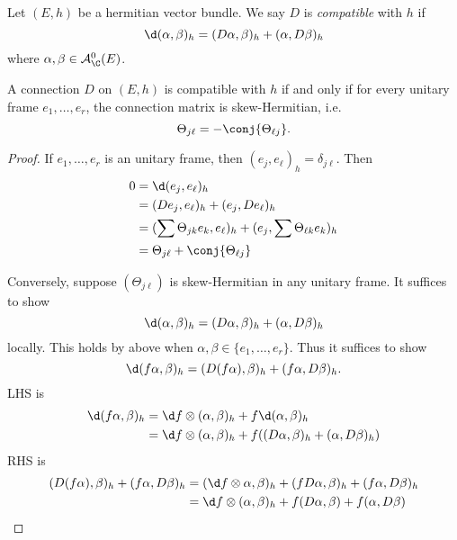 \documentclass[a4paper]{article}
\begin{document}
\begin{definition}
  Let \((E, h)\) be a hermitian vector bundle. We say \(D\) is \emph{compatible} with \(h\) if
  \[
    \d(\alpha, \beta)_h = (D\alpha, \beta)_h + (\alpha, D\beta)_h
  \]
  where \(\alpha, \beta \in \mathcal A_\C^0(E)\).
\end{definition}

\begin{proposition}
  A connection \(D\) on \((E, h)\) is compatible with \(h\) if and only if for every unitary frame \(e_1, \dots, e_r\), the connection matrix is skew-Hermitian, i.e.
  \[
    \Theta_{j\ell} = - \conj{\Theta_{\ell j}}.
  \]
\end{proposition}

\begin{proof}
  If \(e_1, \dots, e_r\) is an unitary frame, then \((e_j, e_\ell)_h = \delta_{j \ell}\). Then
  \begin{align*}
    0
    &= \d (e_j, e_\ell)_h \\
    &= (De_j, e_\ell)_h + (e_j, De_\ell)_h \\
    &= (\sum \Theta_{jk} e_k, e_\ell)_h + (e_j, \sum \Theta_{\ell k} e_k)_h \\
    &= \Theta_{j\ell} + \conj{\Theta_{\ell j}}
  \end{align*}

  Conversely, suppose \((\Theta_{j\ell})\) is skew-Hermitian in any unitary frame. It suffices to show
  \[
    \d(\alpha, \beta)_h = (D\alpha, \beta)_h + (\alpha, D\beta)_h
  \]
  locally. This holds by above when \(\alpha, \beta \in \{e_1, \dots, e_r\}\). Thus it suffices to show
  \[
    \d (f \alpha, \beta)_h = (D(f\alpha), \beta)_h + (f\alpha, D\beta)_h.
  \]
  LHS is
  \begin{align*}
    \d(f\alpha, \beta)_h
    &= \d f \otimes (\alpha, \beta)_h + f \d (\alpha, \beta)_h \\
    &= \d f \otimes (\alpha, \beta)_h + f((D\alpha, \beta)_h + (\alpha, D\beta)_h)
  \end{align*}
  RHS is
  \begin{align*}
    (D(f\alpha), \beta)_h + (f\alpha, D\beta)_h
    &= (\d f \otimes \alpha, \beta)_h + (f D\alpha, \beta)_h + (f\alpha, D\beta)_h \\
    &= \d f \otimes (\alpha, \beta)_h + f(D\alpha, \beta) + f(\alpha, D\beta)
  \end{align*}
\end{proof}






 












\printindex
\end{document}
